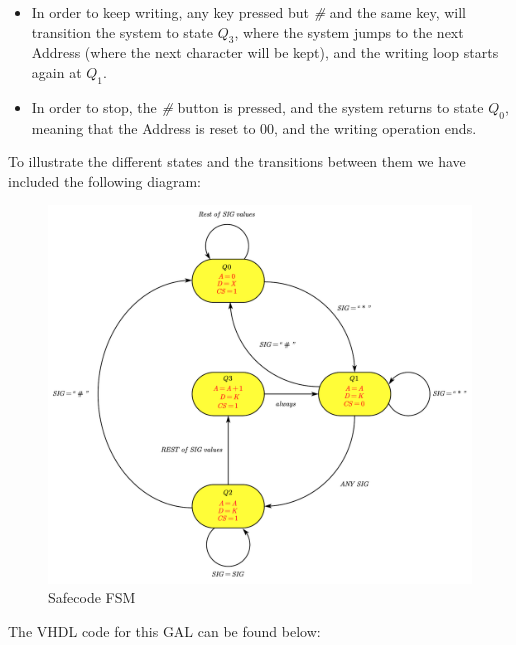 \begin{itemize}
    \item In order to keep writing, any key pressed but \textit{\#} and the same key, will transition the system to state $Q_3$, where the system jumps to the next Address (where the next character will be kept), and the writing loop starts again at \textit{$Q_1$}.
    
    \item In order to stop, the  \textit{\#} button is pressed, and the system returns to state \textit{$Q_0$}, meaning that  the Address is reset to $00$, and the writing operation ends.
\end{itemize}

\clearpage

To illustrate the different states and the transitions between them we have included the following diagram:

\begin{figure}[H]
    \centering
    \includegraphics[scale = 0.55]{Graphics/SAFECODE/SAFECODE.pdf}
    \caption{Safecode FSM}
    \label{fig:SAFECODE_FSM}
\end{figure}

The VHDL code for this GAL can be found below:

            

